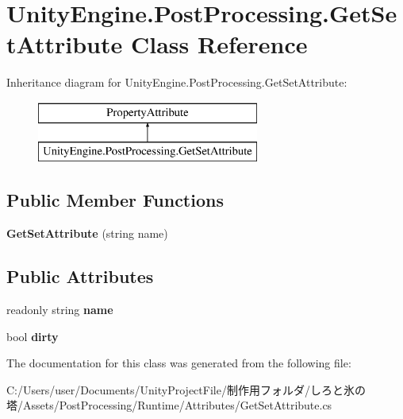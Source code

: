 \hypertarget{class_unity_engine_1_1_post_processing_1_1_get_set_attribute}{}\section{Unity\+Engine.\+Post\+Processing.\+Get\+Set\+Attribute Class Reference}
\label{class_unity_engine_1_1_post_processing_1_1_get_set_attribute}
Inheritance diagram for Unity\+Engine.\+Post\+Processing.\+Get\+Set\+Attribute\+:\begin{figure}[H]
\begin{center}
\leavevmode
\includegraphics[height=2.000000cm]{class_unity_engine_1_1_post_processing_1_1_get_set_attribute}
\end{center}
\end{figure}
\subsection*{Public Member Functions}
\begin{DoxyCompactItemize}
\item 
\mbox{\label{class_unity_engine_1_1_post_processing_1_1_get_set_attribute_a28be93611db1068a1341cd9d376a882c}} 
{\bfseries Get\+Set\+Attribute} (string name)
\end{DoxyCompactItemize}
\subsection*{Public Attributes}
\begin{DoxyCompactItemize}
\item 
\mbox{\label{class_unity_engine_1_1_post_processing_1_1_get_set_attribute_a177f3551073d0f862d77969abb40af98}} 
readonly string {\bfseries name}
\item 
\mbox{\label{class_unity_engine_1_1_post_processing_1_1_get_set_attribute_a370ea457f8789fd73e72f44bca0a1baf}} 
bool {\bfseries dirty}
\end{DoxyCompactItemize}


The documentation for this class was generated from the following file\+:\begin{DoxyCompactItemize}
\item 
C\+:/\+Users/user/\+Documents/\+Unity\+Project\+File/制作用フォルダ/しろと氷の塔/\+Assets/\+Post\+Processing/\+Runtime/\+Attributes/Get\+Set\+Attribute.\+cs\end{DoxyCompactItemize}
